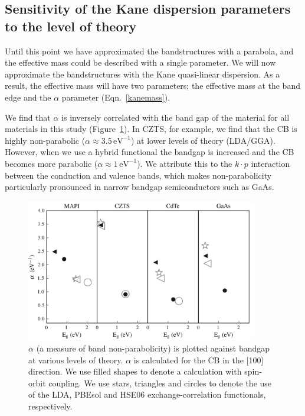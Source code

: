 \subsection{Sensitivity of the Kane dispersion parameters to the level of theory}

Until this point we have approximated the bandstructures with a parabola, and the effective mass could be described with a single parameter.
We will now approximate the bandstructures with the Kane quasi-linear dispersion. As a result, the effective mass will have two parameters; the effective mass at the band edge and the $\alpha$ parameter (Eqn.\ \ref{kanemass}).

We find that $\alpha$ is inversely correlated with the band gap of the material for all materials in this study (Figure\ \ref{alpha_bandgap_plot}). 
In CZTS, for example, we find that the CB is highly non-parabolic ($\alpha\approx3.5\,\textrm{eV}^{-1}$) at lower levels of theory (LDA/GGA).
However, when we use a hybrid functional the bandgap is increased and the CB becomes more parabolic ($\alpha\approx1\,\textrm{eV}^{-1}$).
We attribute this to the $k\cdot p$ interaction between the conduction and valence bands,\autocite{Kane1957} which makes non-parabolicity particularly pronounced in narrow bandgap semiconductors such as GaAs.\autocite{Szmyd1990}

\begin{figure}[tb] \centering
\includegraphics[width=0.9\textwidth]{./figures/ch4/alpha_bandgap_plot.png}
\caption[Band non-parabolicity vs bandgap]{\label{alpha_bandgap_plot}$\alpha$ (a measure of band non-parabolicity) is plotted against bandgap at various levels of theory. $\alpha$ is calculated for the CB in the [100] direction. We use filled shapes to denote a calculation with spin-orbit coupling. We use stars, triangles and circles to denote the use of the LDA, PBEsol and HSE06 exchange-correlation functionals, respectively. }
\end{figure}

